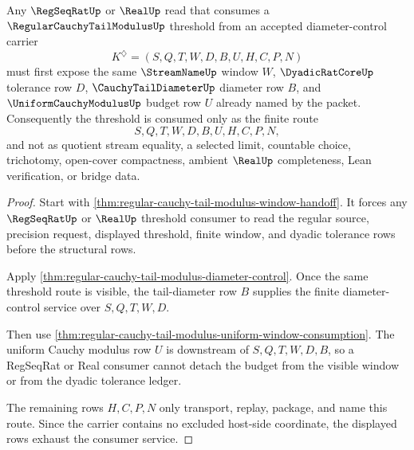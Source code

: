 \begin{theorem}
\label{thm:regular-cauchy-tail-modulus-regseqrat-consumer}
Any $\RegSeqRatUp$ or $\RealUp$ read that consumes a $\RegularCauchyTailModulusUp$ threshold from an accepted diameter-control carrier
$$
K^{\diamondsuit}=(S,Q,T,W,D,B,U,H,C,P,N)
$$
must first expose the same $\StreamNameUp$ window $W$, $\DyadicRatCoreUp$ tolerance row $D$, $\CauchyTailDiameterUp$ diameter row $B$, and $\UniformCauchyModulusUp$ budget row $U$ already named by the packet. Consequently the threshold is consumed only as the finite route
$$
S,Q,T,W,D,B,U,H,C,P,N ,
$$
and not as quotient stream equality, a selected limit, countable choice, trichotomy, open-cover compactness, ambient $\RealUp$ completeness, Lean verification, or bridge data.
\end{theorem}
\begin{proof}
Start with \autoref{thm:regular-cauchy-tail-modulus-window-handoff}. It forces any $\RegSeqRatUp$ or $\RealUp$ threshold consumer to read the regular source, precision request, displayed threshold, finite window, and dyadic tolerance rows before the structural rows.

Apply \autoref{thm:regular-cauchy-tail-modulus-diameter-control}. Once the same threshold route is visible, the tail-diameter row $B$ supplies the finite diameter-control service over $S,Q,T,W,D$.

Then use \autoref{thm:regular-cauchy-tail-modulus-uniform-window-consumption}. The uniform Cauchy modulus row $U$ is downstream of $S,Q,T,W,D,B$, so a RegSeqRat or Real consumer cannot detach the budget from the visible window or from the dyadic tolerance ledger.

The remaining rows $H,C,P,N$ only transport, replay, package, and name this route. Since the carrier contains no excluded host-side coordinate, the displayed rows exhaust the consumer service.
\end{proof}


